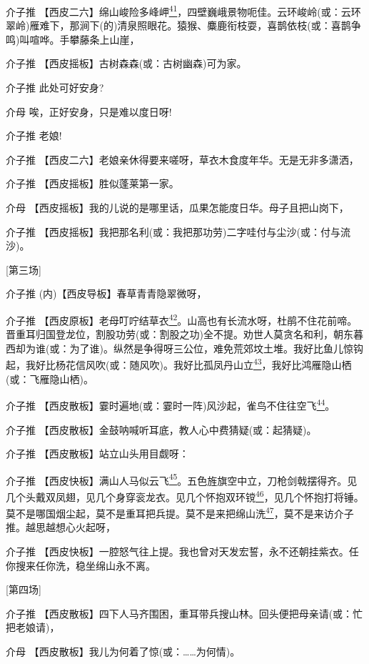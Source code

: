 介子推
【西皮二六】绵山峻险多峰岬\protect\hyperlink{fn41}{\textsuperscript{41}}，四壁巍峨景物呃佳。云环峻岭(或：云环翠岭)雁难下，那涧下(的)清泉照眼花。猿猴、麋鹿衔枝耍，喜鹊依枝(或：喜鹊争鸣)叫喧哗。手攀藤条上山崖，

介子推 【西皮摇板】古树森森(或：古树幽森)可为家。

介子推 此处可好安身?

介母 唉，正好安身，只是难以度日呀!

介子推 老娘!

介子推 【西皮二六】老娘亲休得要来嗟呀，草衣木食度年华。无是无非多潇洒，

介子推 【西皮摇板】胜似蓬莱第一家。

介母 【西皮摇板】我的儿说的是哪里话，瓜果怎能度日华。母子且把山岗下，

介子推
【西皮摇板】我把那名利(或：我把那功劳)二字哇付与尘沙(或：付与流沙)。

{[}第三场{]}

介子推 (内)【西皮导板】春草青青隐翠微呀，

介子推
【西皮原板】老母叮咛结草衣\protect\hyperlink{fn42}{\textsuperscript{42}}。山高也有长流水呀，杜鹃不住花前啼。晋重耳归国登龙位，割股功劳(或：割股之功)全不提。劝世人莫贪名和利，朝东暮西却为谁(或：为了谁)。纵然是争得呀三公位，难免荒郊坟土堆。我好比鱼儿惊钩起，我好比杨花信风吹(或：随风吹)。我好比孤凤丹山立\protect\hyperlink{fn43}{\textsuperscript{43}}，我好比鸿雁隐山栖(或：飞雁隐山栖)。

介子推
【西皮散板】霎时遍地(或：霎时一阵)风沙起，雀鸟不住往空飞\protect\hyperlink{fn44}{\textsuperscript{44}}。

介子推 【西皮散板】金鼓呐喊听耳底，教人心中费猜疑(或：起猜疑)。

介子推 【西皮散板】站立山头用目觑呀：

介子推
【西皮快板】满山人马似云飞\protect\hyperlink{fn45}{\textsuperscript{45}}。五色旌旗空中立，刀枪剑戟摆得齐。见几个头戴双凤翅，见几个身穿衮龙衣。见几个怀抱双环镋\protect\hyperlink{fn46}{\textsuperscript{46}}，见几个怀抱打将锤。莫不是哪国烟尘起，莫不是重耳把兵提。莫不是来把绵山洗\protect\hyperlink{fn47}{\textsuperscript{47}}，莫不是来访介子推。越思越想心火起呀，

介子推
【西皮快板】一腔怒气往上提。我也曾对天发宏誓，永不还朝挂紫衣。任你搜来任你洗，稳坐绵山永不离。

{[}第四场{]}

介子推
【西皮散板】四下人马齐围困，重耳带兵搜山林。回头便把母亲请(或：忙把老娘请)，

介母 【西皮散板】我儿为何着了惊(或：\ldots{}\ldots{}为何情)。

